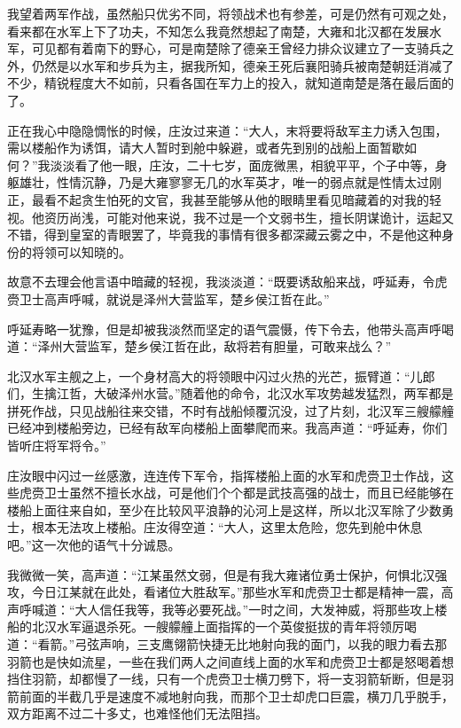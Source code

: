 我望着两军作战，虽然船只优劣不同，将领战术也有参差，可是仍然有可观之处，看来都在水军上下了功夫，不知怎么我竟然想起了南楚，大雍和北汉都在发展水军，可见都有着南下的野心，可是南楚除了德亲王曾经力排众议建立了一支骑兵之外，仍然是以水军和步兵为主，据我所知，德亲王死后襄阳骑兵被南楚朝廷消减了不少，精锐程度大不如前，只看各国在军力上的投入，就知道南楚是落在最后面的了。

正在我心中隐隐惆怅的时候，庄汝过来道：“大人，末将要将敌军主力诱入包围，需以楼船作为诱饵，请大人暂时到舱中躲避，或者先到别的战船上面暂歇如何？”我淡淡看了他一眼，庄汝，二十七岁，面庞微黑，相貌平平，个子中等，身躯雄壮，性情沉静，乃是大雍寥寥无几的水军英才，唯一的弱点就是性情太过刚正，最看不起贪生怕死的文官，我甚至能够从他的眼睛里看见暗藏着的对我的轻视。他资历尚浅，可能对他来说，我不过是一个文弱书生，擅长阴谋诡计，运起又不错，得到皇室的青眼罢了，毕竟我的事情有很多都深藏云雾之中，不是他这种身份的将领可以知晓的。

故意不去理会他言语中暗藏的轻视，我淡淡道：“既要诱敌船来战，呼延寿，令虎赍卫士高声呼喊，就说是泽州大营监军，楚乡侯江哲在此。”

呼延寿略一犹豫，但是却被我淡然而坚定的语气震慑，传下令去，他带头高声呼喝道：“泽州大营监军，楚乡侯江哲在此，敌将若有胆量，可敢来战么？”

北汉水军主舰之上，一个身材高大的将领眼中闪过火热的光芒，振臂道：“儿郎们，生擒江哲，大破泽州水营。”随着他的命令，北汉水军攻势越发猛烈，两军都是拼死作战，只见战船往来交错，不时有战船倾覆沉没，过了片刻，北汉军三艘艨艟已经冲到楼船旁边，已经有敌军向楼船上面攀爬而来。我高声道：“呼延寿，你们皆听庄将军将令。”

庄汝眼中闪过一丝感激，连连传下军令，指挥楼船上面的水军和虎赍卫士作战，这些虎赍卫士虽然不擅长水战，可是他们个个都是武技高强的战士，而且已经能够在楼船上面往来自如，至少在比较风平浪静的沁河上是这样，所以北汉军除了少数勇士，根本无法攻上楼船。庄汝得空道：“大人，这里太危险，您先到舱中休息吧。”这一次他的语气十分诚恳。

我微微一笑，高声道：“江某虽然文弱，但是有我大雍诸位勇士保护，何惧北汉强攻，今日江某就在此处，看诸位大胜敌军。”那些水军和虎赍卫士都是精神一震，高声呼喊道：“大人信任我等，我等必要死战。”一时之间，大发神威，将那些攻上楼船的北汉水军逼退杀死。一艘艨艟上面指挥的一个英俊挺拔的青年将领厉喝道：“看箭。”弓弦声响，三支鹰翎箭快捷无比地射向我的面门，以我的眼力看去那羽箭也是快如流星，一些在我们两人之间直线上面的水军和虎赍卫士都是怒喝着想挡住羽箭，却都慢了一线，只有一个虎赍卫士横刀劈下，将一支羽箭斩断，但是羽箭前面的半截几乎是速度不减地射向我，而那个卫士却虎口巨震，横刀几乎脱手，双方距离不过二十多丈，也难怪他们无法阻挡。

